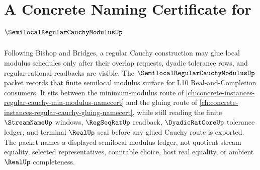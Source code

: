 \chapter{A Concrete Naming Certificate for $\SemilocalRegularCauchyModulusUp$}
\label{ch:concrete-instances-semilocal-regular-cauchy-modulus-namecert}

Following Bishop and Bridges, a regular Cauchy construction may glue local modulus schedules only after their overlap requests, dyadic tolerance rows, and regular-rational readbacks are visible. The $\SemilocalRegularCauchyModulusUp$ packet records that finite semilocal modulus surface for L10 Real-and-Completion consumers. It sits between the minimum-modulus route of \autoref{ch:concrete-instances-regular-cauchy-min-modulus-namecert} and the gluing route of \autoref{ch:concrete-instances-regular-cauchy-gluing-namecert}, while still reading the finite $\StreamNameUp$ windows, $\RegSeqRatUp$ readback, $\DyadicRatCoreUp$ tolerance ledger, and terminal $\RealUp$ seal before any glued Cauchy route is exported. The packet names a displayed semilocal modulus ledger, not quotient stream equality, selected representatives, countable choice, host real equality, or ambient $\RealUp$ completeness.

